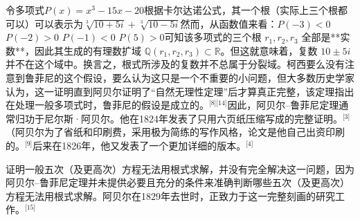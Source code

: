 令多项式$P(x) = x^3 - 15x - 20$根据卡尔达诺公式，其一个根（实际上三个根都可以）可以表示为$\sqrt[3]{10 + 5i} + \sqrt[3]{10 - 5i}$然而，从函数值来看：$P(-3) < 0$ $P(-2) > 0$ $P(-1) < 0$ $P(5) > 0$可知该多项式的三个根 $r_1, r_2, r_3$ 全部是**实数**，因此其生成的有理数扩域 $\mathbb{Q}(r_1, r_2, r_3) \subset \mathbb{R}$。但这就意味着，复数 $10 \pm 5i$ 并不在这个域中。换言之，根式所涉及的复数并不总属于分裂域。柯西要么没有注意到鲁菲尼的这个假设，要么认为这只是一个不重要的小问题，但大多数历史学家认为，这一证明直到阿贝尔证明了“自然无理性定理”后才算真正完整，该定理指出在处理一般多项式时，鲁菲尼的假设是成立的。\(^\text{[8][14]}\)因此，阿贝尔–鲁菲尼定理通常归功于尼尔斯·阿贝尔。他在1824年发表了只用六页纸压缩写成的完整证明。\(^\text{[3]}\)（阿贝尔为了省纸和印刷费，采用极为简练的写作风格，论文是他自己出资印刷的。\(^\text{[9]}\)后来在1826年，他又发表了一个更加详细的版本。\(^\text{[4]}\)

证明一般五次（及更高次）方程无法用根式求解，并没有完全解决这一问题，因为阿贝尔–鲁菲尼定理并未提供必要且充分的条件来准确判断哪些五次（及更高次）方程无法用根式求解。阿贝尔在1829年去世时，正致力于这一完整刻画的研究工作。\(^\text{[15]}\)
